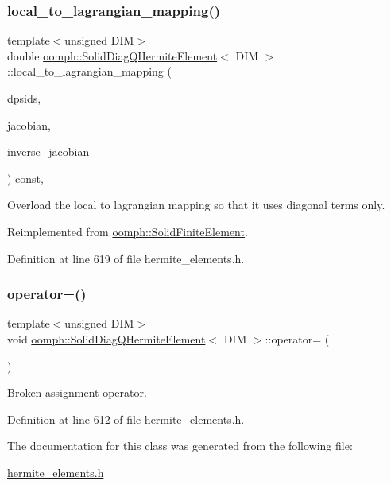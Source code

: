 \subsubsection{\texorpdfstring{local\+\_\+to\+\_\+lagrangian\+\_\+mapping()}{local\_to\_lagrangian\_mapping()}}
{\footnotesize\ttfamily template$<$unsigned D\+IM$>$ \\
double \hyperlink{classoomph_1_1SolidDiagQHermiteElement}{oomph\+::\+Solid\+Diag\+Q\+Hermite\+Element}$<$ D\+IM $>$\+::local\+\_\+to\+\_\+lagrangian\+\_\+mapping (\begin{DoxyParamCaption}\item[{const \hyperlink{classoomph_1_1DShape}{D\+Shape} \&}]{dpsids,  }\item[{\hyperlink{classoomph_1_1DenseMatrix}{Dense\+Matrix}$<$ double $>$ \&}]{jacobian,  }\item[{\hyperlink{classoomph_1_1DenseMatrix}{Dense\+Matrix}$<$ double $>$ \&}]{inverse\+\_\+jacobian }\end{DoxyParamCaption}) const\hspace{0.3cm}{\ttfamily [inline]}, {\ttfamily [virtual]}}



Overload the local to lagrangian mapping so that it uses diagonal terms only. 



Reimplemented from \hyperlink{classoomph_1_1SolidFiniteElement_a8974f3df67362e2b1be171b71294b16c}{oomph\+::\+Solid\+Finite\+Element}.



Definition at line 619 of file hermite\+\_\+elements.\+h.

\mbox{\label{classoomph_1_1SolidDiagQHermiteElement_a330dcbff2c869083f7009325d85d15d6}} 
\subsubsection{\texorpdfstring{operator=()}{operator=()}}
{\footnotesize\ttfamily template$<$unsigned D\+IM$>$ \\
void \hyperlink{classoomph_1_1SolidDiagQHermiteElement}{oomph\+::\+Solid\+Diag\+Q\+Hermite\+Element}$<$ D\+IM $>$\+::operator= (\begin{DoxyParamCaption}\item[{const \hyperlink{classoomph_1_1SolidDiagQHermiteElement}{Solid\+Diag\+Q\+Hermite\+Element}$<$ D\+IM $>$ \&}]{ }\end{DoxyParamCaption})\hspace{0.3cm}{\ttfamily [inline]}}



Broken assignment operator. 



Definition at line 612 of file hermite\+\_\+elements.\+h.



The documentation for this class was generated from the following file\+:\begin{DoxyCompactItemize}
\item 
\hyperlink{hermite__elements_8h}{hermite\+\_\+elements.\+h}\end{DoxyCompactItemize}
